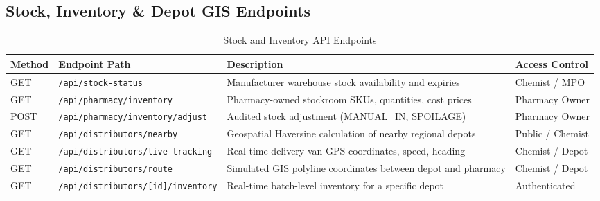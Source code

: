 \documentclass[10pt,a4paper]{article}
\begin{document}
\subsection{Stock, Inventory \& Depot GIS Endpoints}
\begin{table}[h!]
\centering
\small
\begin{tabularx}{\textwidth}{lp{4.0cm}Xp{2.5cm}}
\toprule
\textbf{Method} & \textbf{Endpoint Path} & \textbf{Description} & \textbf{Access Control} \\
\midrule
GET & \texttt{/api/stock-status} & Manufacturer warehouse stock availability and expiries & Chemist / MPO \\
GET & \texttt{/api/pharmacy/inventory} & Pharmacy-owned stockroom SKUs, quantities, cost prices & Pharmacy Owner \\
POST & \texttt{/api/pharmacy/inventory/adjust} & Audited stock adjustment (MANUAL\_IN, SPOILAGE) & Pharmacy Owner \\
GET & \texttt{/api/distributors/nearby} & Geospatial Haversine calculation of nearby regional depots & Public / Chemist \\
GET & \texttt{/api/distributors/live-tracking}& Real-time delivery van GPS coordinates, speed, heading & Chemist / Depot \\
GET & \texttt{/api/distributors/route} & Simulated GIS polyline coordinates between depot and pharmacy& Chemist / Depot \\
GET & \texttt{/api/distributors/[id]/inventory}& Real-time batch-level inventory for a specific depot & Authenticated \\
\bottomrule
\end{tabularx}
\caption{Stock and Inventory API Endpoints}
\end{table}
\end{document}

